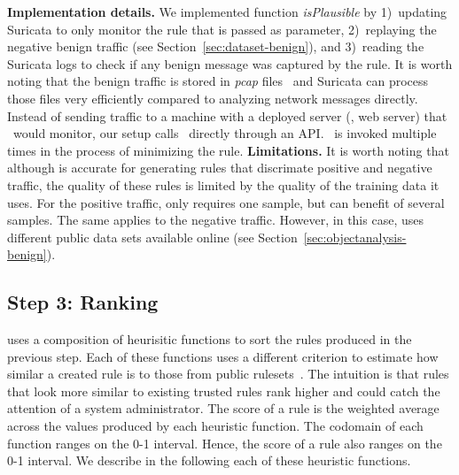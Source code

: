 \documentclass[sigconf,review, anonymous]{acmart}
\begin{document}
\textbf{Implementation details.} We implemented function
\emph{isPlausible} by 1)~updating Suricata to only monitor the rule
that is passed as parameter, 2)~replaying the negative benign traffic (see
Section~\ref{sec:dataset-benign}), and 3)~reading the Suricata logs to
check if any benign message was captured by the rule. It is worth
noting that the benign traffic is stored in \emph{pcap}
files~\cite{pcap} and Suricata can process those files very
efficiently compared to analyzing network messages directly. Instead
of sending traffic to a machine with a deployed server (\eg{}, web
server) that \suri\ would monitor, our setup calls \suri\ directly
through an API. \suri\ is invoked multiple times in the process of
minimizing the rule.  \textbf{Limitations.} It is worth noting that
although \tname{} is accurate for generating rules that discrimate
positive and negative traffic, the quality of these rules is limited
by the quality of the training data it uses. For the positive traffic,
\tname{} only requires one sample, but can benefit of several
samples. The same
applies to the negative traffic. However, in this case, \tname{} uses
different public data sets available online (see
Section~\ref{sec:objectanalysis-benign}).

\subsection{Step 3: Ranking}
\label{sec:ranking}

\tname{} uses a composition of heurisitic functions to sort the rules
produced in the previous step. Each of these functions uses a
different criterion to estimate how similar a created rule is to those
from public rulesets~\cite{emerging-threats-open}. The
intuition is that rules that look more similar to existing trusted
rules rank higher and could catch the attention of a system
administrator. The score of a rule is the weighted average across the
values produced by each heuristic function. The codomain of each
function ranges on the 0-1 interval. Hence, the score of a rule also
ranges on the 0-1 interval. We describe in the following each of these
heuristic functions.

\end{document}
